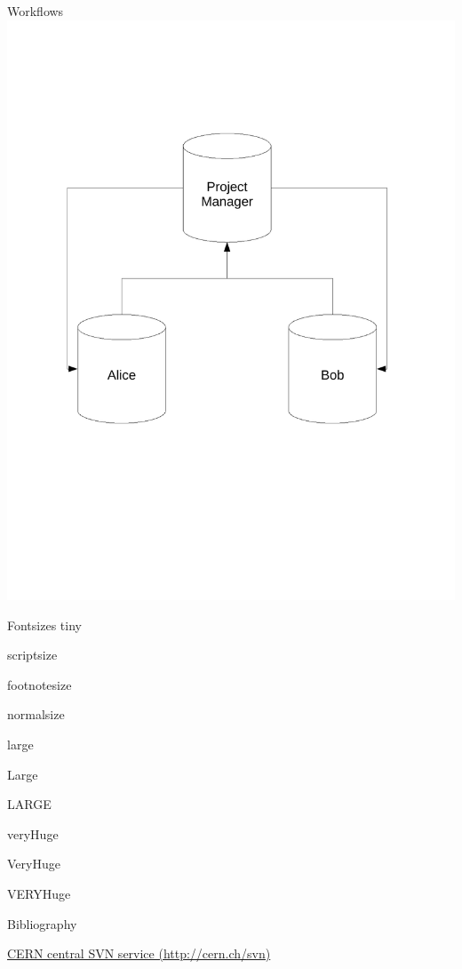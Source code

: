 \documentclass[final,hyperref={pdfpagelabels=false},notitlepage=true]{beamer}
\begin{document}
\begin{frame}{}
\begin{columns}[t]
\begin{column}{0.45\linewidth}
\begin{block}{\large Workflows}
          \includegraphics[scale=1.00]{images/collaborativeDevelopmentWithMaintainer.pdf}
        \end{block}
    \begin{block}{\large Fontsizes}
      \centering
      {\tiny tiny}\par
      {\scriptsize scriptsize}\par
      {\footnotesize footnotesize}\par
      {\normalsize normalsize}\par
      {\large large}\par
      {\Large Large}\par
      {\LARGE LARGE}\par
      {\veryHuge veryHuge}\par
      {\VeryHuge VeryHuge}\par
      {\VERYHuge VERYHuge}\par
    \end{block}

\begin{block}{\large Bibliography}
\begin{thebibliography}{9}
\href{http://cern.ch/svn}{CERN central SVN service (http://cern.ch/svn)}


\end{thebibliography}
\end{block}
\end{column}
\end{columns}
\end{frame}
\end{document}
